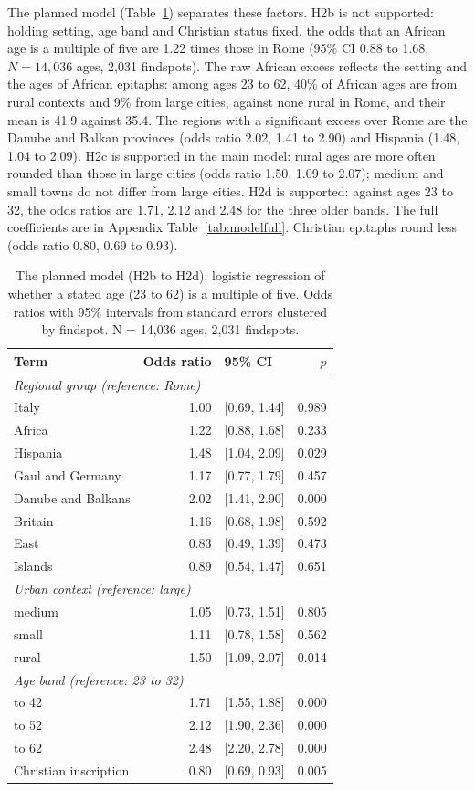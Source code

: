 \documentclass[11pt,a4paper]{article}
\begin{document}
The planned model (Table~\ref{tab:model}) separates these factors. H2b is not supported: holding setting, age band and Christian status fixed, the odds that an African age is a multiple of five are 1.22 times those in Rome (95\% CI 0.88 to 1.68, $N = 14,036$ ages, 2,031 findspots). The raw African excess reflects the setting and the ages of African epitaphs: among ages 23 to 62, 40\% of African ages are from rural contexts and 9\% from large cities, against none rural in Rome, and their mean is 41.9 against 35.4. The regions with a significant excess over Rome are the Danube and Balkan provinces (odds ratio 2.02, 1.41 to 2.90) and Hispania (1.48, 1.04 to 2.09). H2c is supported in the main model: rural ages are more often rounded than those in large cities (odds ratio 1.50, 1.09 to 2.07); medium and small towns do not differ from large cities. H2d is supported: against ages 23 to 32, the odds ratios are 1.71, 2.12 and 2.48 for the three older bands. The full coefficients are in Appendix Table~\ref{tab:modelfull}. Christian epitaphs round less (odds ratio 0.80, 0.69 to 0.93).

\begin{table}[tbp]\centering\small\caption{The planned model (H2b to H2d): logistic regression of whether a stated age (23 to 62) is a multiple of five. Odds ratios with 95\% intervals from standard errors clustered by findspot. N = 14,036 ages, 2,031 findspots.}\label{tab:model}\begin{tabular}{lrlr}\toprule Term & Odds ratio & 95\% CI & $p$\\\midrule
\multicolumn{4}{l}{\textit{Regional group (reference: Rome)}}\\
\quad Italy & 1.00 & [0.69, 1.44] & 0.989\\
\quad Africa & 1.22 & [0.88, 1.68] & 0.233\\
\quad Hispania & 1.48 & [1.04, 2.09] & 0.029\\
\quad Gaul and Germany & 1.17 & [0.77, 1.79] & 0.457\\
\quad Danube and Balkans & 2.02 & [1.41, 2.90] & 0.000\\
\quad Britain & 1.16 & [0.68, 1.98] & 0.592\\
\quad East & 0.83 & [0.49, 1.39] & 0.473\\
\quad Islands & 0.89 & [0.54, 1.47] & 0.651\\
\multicolumn{4}{l}{\textit{Urban context (reference: large)}}\\
\quad medium & 1.05 & [0.73, 1.51] & 0.805\\
\quad small & 1.11 & [0.78, 1.58] & 0.562\\
\quad rural & 1.50 & [1.09, 2.07] & 0.014\\
\multicolumn{4}{l}{\textit{Age band (reference: 23 to 32)}}\\
\quad 33 to 42 & 1.71 & [1.55, 1.88] & 0.000\\
\quad 43 to 52 & 2.12 & [1.90, 2.36] & 0.000\\
\quad 53 to 62 & 2.48 & [2.20, 2.78] & 0.000\\
Christian inscription & 0.80 & [0.69, 0.93] & 0.005\\
\bottomrule\end{tabular}\end{table}
\end{document}
